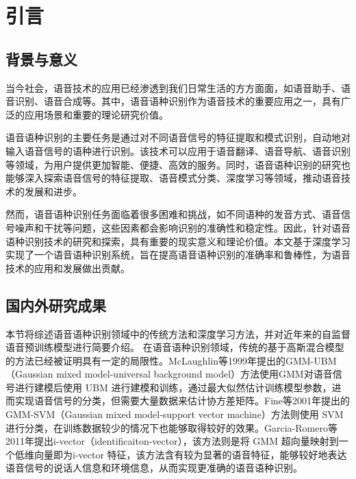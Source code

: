 \chapter{引言}
\section{背景与意义}
当今社会，语音技术的应用已经渗透到我们日常生活的方方面面，如语音助手、语音识别、语音合成等。其中，语音语种识别作为语音技术的重要应用之一，具有广泛的应用场景和重要的理论研究价值。

语音语种识别的主要任务是通过对不同语音信号的特征提取和模式识别，自动地对输入语音信号的语种进行识别。该技术可以应用于语音翻译、语音导航、语音识别等领域，为用户提供更加智能、便捷、高效的服务。同时，语音语种识别的研究也能够深入探索语音信号的特征提取、语音模式分类、深度学习等领域，推动语音技术的发展和进步。

然而，语音语种识别任务面临着很多困难和挑战，如不同语种的发音方式、语音信号噪声和干扰等问题，这些因素都会影响识别的准确性和稳定性。因此，针对语音语种识别技术的研究和探索，具有重要的现实意义和理论价值。本文基于深度学习实现了一个语音语种识别系统，旨在提高语音语种识别的准确率和鲁棒性，为语音技术的应用和发展做出贡献。

\section{国内外研究成果}
本节将综述语音语种识别领域中的传统方法和深度学习方法，并对近年来的自监督语音预训练模型进行简要介绍。
在语音语种识别领域，传统的基于高斯混合模型的方法已经被证明具有一定的局限性。McLaughlin等1999年提出的GMM-UBM（Gaussian mixed model-universal background model）\cite{mclaughlin_study_1999}方法使用GMM对语音信号进行建模后使用 UBM 进行建模和训练，通过最大似然估计训练模型参数，进而实现语音信号的分类，但需要大量数据来估计协方差矩阵。Fine等2001年提出的GMM-SVM（Gaussian mixed model-support vector machine）\cite{fine_hybrid_2001}方法则使用 SVM 进行分类，在训练数据较少的情况下也能够取得较好的效果。Garcia-Romero等2011年提出i-vector（identificaiton-vector）\cite{garcia-romero_analysis_nodate}，该方法则是将 GMM 超向量映射到一个低维向量即为i-vector 特征，该方法含有较为显著的语音特征，能够较好地表达语音信号的说话人信息和环境信息，从而实现更准确的语音语种识别。


